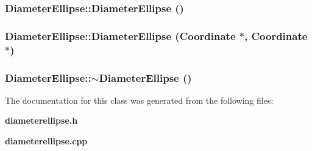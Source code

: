 \subsubsection{\setlength{\rightskip}{0pt plus 5cm}Diameter\-Ellipse::Diameter\-Ellipse ()}\label{classDiameterEllipse_a0}


\subsubsection{\setlength{\rightskip}{0pt plus 5cm}Diameter\-Ellipse::Diameter\-Ellipse ({\bf Coordinate} $\ast$, {\bf Coordinate} $\ast$)}\label{classDiameterEllipse_a1}


\subsubsection{\setlength{\rightskip}{0pt plus 5cm}Diameter\-Ellipse::$\sim$Diameter\-Ellipse ()}\label{classDiameterEllipse_a2}




The documentation for this class was generated from the following files:\begin{CompactItemize}
\item 
{\bf diameterellipse.h}\item 
{\bf diameterellipse.cpp}\end{CompactItemize}
